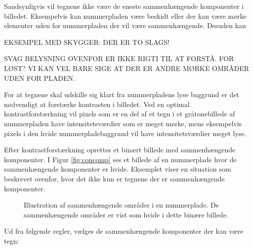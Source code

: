 Sandsynligvis vil tegnene ikke være de eneste sammenhængende komponenter i billedet. Eksempelvis kan nummerpladen være beskidt eller der kan være mørke elementer uden for nummerpladen der vil være sammenhængende. Desuden kan 

EKSEMPEL MED SKYGGER: DER ER TO SLAGS!

SVAG BELYSNING OVENFOR ER IKKE RIGTI TIL AT FORSTÅ. FOR LØST? VI KAN VEL BARE SIGE AT DER ER ANDRE MØRKE OMRÅDER UDEN FOR PLADEN.

For at tegnene skal udskille sig klart fra nummerpladens lyse baggrund er det nødvendigt at forstærke kontrasten i billedet. Ved en optimal kontrastforstærkning vil pixels som er en del af et tegn i et gråtonebillede af nummerpladen have intensitetsværdier som er meget mørke, mens eksempelvis pixels i den hvide nummerpladebaggrund vil have intensitetsværdier meget lyse.



Efter kontrastforstærkning oprettes et binært billede med sammenhængende komponenter. I Figur \vref{fig:concomp} ses et billede af en nummerplade hvor de sammenhængende komponenter er hvide. Eksemplet viser en situation som beskrevet ovenfor, hvor det ikke kun er tegnene der er sammenhængende komponenter.

\begin{figure}[htp]
  \centering
  \caption{Illustration af sammenhængende områder i en nummerplade. De sammenhængende områder er vist som hvide i dette binære billede.}
  \label{fig:concomp}
\end{figure}

Ud fra følgende regler, vælges de sammenhængende komponenter der kan være tegn:


